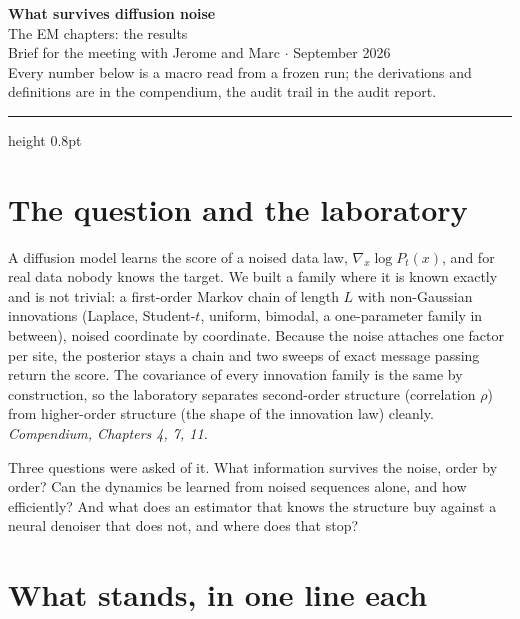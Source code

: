 \documentclass[11pt,a4paper]{article}
\newcommand{\comp}[1]{{\small\textit{Compendium, #1.}}}
\begin{document}
\begin{center}
{\LARGE\bfseries What survives diffusion noise}\\[0.4em]
{\large The EM chapters: the results}\\[0.8em]
{\small Brief for the meeting with Jerome and Marc \quad$\cdot$ September 2026}\\[0.2em]
{\footnotesize Every number below is a macro read from a frozen run; the derivations and definitions are in the compendium, the audit trail in the audit report.}
\end{center}
\vspace{0.3em}\hrule height 0.8pt\vspace{1em}

\section{The question and the laboratory}

A diffusion model learns the score of a noised data law, $\nabla_x\log P_t(x)$, and for real data
nobody knows the target. We built a family where it is known exactly and is not trivial: a
first-order Markov chain of length $L$ with non-Gaussian innovations (Laplace, Student-$t$,
uniform, bimodal, a one-parameter family in between), noised coordinate by coordinate. Because
the noise attaches one factor per site, the posterior stays a chain and two sweeps of exact
message passing return the score. The covariance of every innovation family is the same by
construction, so the laboratory separates second-order structure (correlation $\rho$) from
higher-order structure (the shape of the innovation law) cleanly. \comp{Chapters 4, 7, 11}

Three questions were asked of it. What information survives the noise, order by order? Can the
dynamics be learned from noised sequences alone, and how efficiently? And what does an
estimator that knows the structure buy against a neural denoiser that does not, and where does
that stop?

\section{What stands, in one line each}
\end{document}
